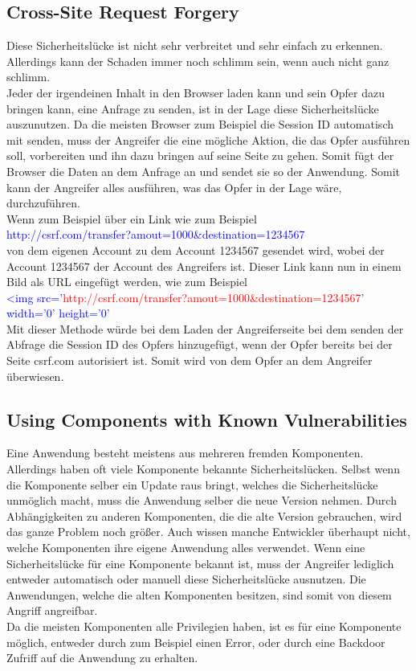 \subsection{Cross-Site Request Forgery}
Diese Sicherheitslücke ist nicht sehr verbreitet und sehr einfach zu erkennen. Allerdings kann der Schaden immer noch schlimm sein, wenn auch nicht ganz schlimm. \\
Jeder der irgendeinen Inhalt in den Browser laden kann und sein Opfer dazu bringen kann, eine Anfrage zu senden, ist in der Lage diese Sicherheitslücke auszunutzen. Da die meisten Browser zum Beispiel die Session ID automatisch mit senden, muss der Angreifer die eine mögliche Aktion, die das Opfer ausführen soll, vorbereiten und ihn dazu bringen auf seine Seite zu gehen. Somit fügt der Browser die Daten an dem Anfrage an und sendet sie so der Anwendung. Somit kann der Angreifer alles ausführen, was das Opfer in der Lage wäre, durchzuführen. \\
Wenn zum Beispiel über ein Link wie zum Beispiel \\ 
\textcolor{blue}{http://csrf.com/transfer?amout=1000\&destination=1234567} \\ 
 von dem eigenen Account zu dem Account 1234567 gesendet wird, wobei der Account 1234567 der Account des Angreifers ist. Dieser Link kann nun in einem Bild als URL eingefügt werden, wie zum Beispiel \\
\textcolor{blue}{<img src='\textcolor{red}{http://csrf.com/transfer?amout=1000\&destination=1234567}' \\ width='0' height='0'} \\
Mit dieser Methode würde bei dem Laden der Angreiferseite bei dem senden der Abfrage die Session ID des Opfers hinzugefügt, wenn der Opfer bereits bei der Seite csrf.com autorisiert ist. Somit wird von dem Opfer  an dem Angreifer überwiesen.
\subsection{Using Components with Known Vulnerabilities}
Eine Anwendung besteht meistens aus mehreren fremden Komponenten. Allerdings haben oft viele Komponente bekannte Sicherheitslücken. Selbst wenn die Komponente selber ein Update raus bringt, welches die Sicherheitslücke unmöglich macht, muss die Anwendung selber die neue Version nehmen. Durch Abhängigkeiten zu anderen Komponenten, die die alte Version gebrauchen, wird das ganze Problem noch größer. Auch wissen manche Entwickler überhaupt nicht, welche Komponenten ihre eigene Anwendung alles verwendet. Wenn eine Sicherheitslücke für eine Komponente bekannt ist, muss der Angreifer lediglich entweder automatisch oder manuell diese Sicherheitslücke ausnutzen. Die Anwendungen, welche die alten Komponenten besitzen, sind somit von diesem Angriff angreifbar. \\
Da die meisten Komponenten alle Privilegien haben, ist es für eine Komponente möglich, entweder durch zum Beispiel einen Error, oder durch eine Backdoor Zufriff auf die Anwendung zu erhalten.
